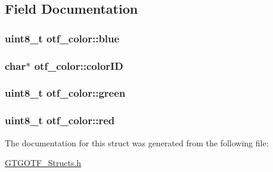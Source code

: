 \subsection{Field Documentation}
\hypertarget{structotf__color_ae6e59a72e6d53e8f13916deafacc52f6}{
\subsubsection[{blue}]{\setlength{\rightskip}{0pt plus 5cm}uint8\-\_\-t otf\-\_\-color\-::blue}}\label{structotf__color_ae6e59a72e6d53e8f13916deafacc52f6}
\hypertarget{structotf__color_a2b4dac25aa93f339f7f133befbafc144}{
\subsubsection[{color\-I\-D}]{\setlength{\rightskip}{0pt plus 5cm}char$\ast$ otf\-\_\-color\-::color\-I\-D}}\label{structotf__color_a2b4dac25aa93f339f7f133befbafc144}
\hypertarget{structotf__color_aab6d70bd00e226b845719f7363cbb809}{
\subsubsection[{green}]{\setlength{\rightskip}{0pt plus 5cm}uint8\-\_\-t otf\-\_\-color\-::green}}\label{structotf__color_aab6d70bd00e226b845719f7363cbb809}
\hypertarget{structotf__color_af3ff520576ee8bccf9d2bc85614e9501}{
\subsubsection[{red}]{\setlength{\rightskip}{0pt plus 5cm}uint8\-\_\-t otf\-\_\-color\-::red}}\label{structotf__color_af3ff520576ee8bccf9d2bc85614e9501}


The documentation for this struct was generated from the following file\-:\begin{DoxyCompactItemize}
\item 
\hyperlink{GTGOTF__Structs_8h}{G\-T\-G\-O\-T\-F\-\_\-\-Structs.\-h}\end{DoxyCompactItemize}
